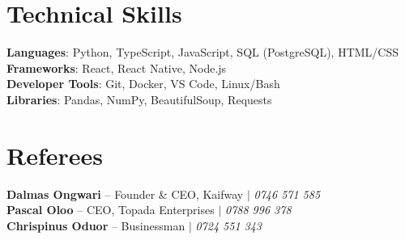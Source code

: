 \documentclass[letterpaper,11pt]{article}
\begin{document}
\section{Technical Skills}
 \begin{itemize}[leftmargin=0.15in, label={}]
    \small{\item{
     \textbf{Languages}{: Python, TypeScript, JavaScript, SQL (PostgreSQL), HTML/CSS} \\
     \textbf{Frameworks}{: React, React Native, Node.js} \\
     \textbf{Developer Tools}{: Git, Docker, VS Code, Linux/Bash} \\
     \textbf{Libraries}{: Pandas, NumPy, BeautifulSoup, Requests}
    }}
 \end{itemize}


\section{Referees}
 \begin{itemize}[leftmargin=0.15in, label={}]
    \small{\item{
     \textbf{Dalmas Ongwari} -- Founder & CEO, Kaifway $|$ \emph{0746 571 585} \\
     \textbf{Pascal Oloo} -- CEO, Topada Enterprises $|$ \emph{0788 996 378} \\
     \textbf{Chrispinus Oduor} -- Businessman $|$ \emph{0724 551 343}
    }}
 \end{itemize}


\end{document}
